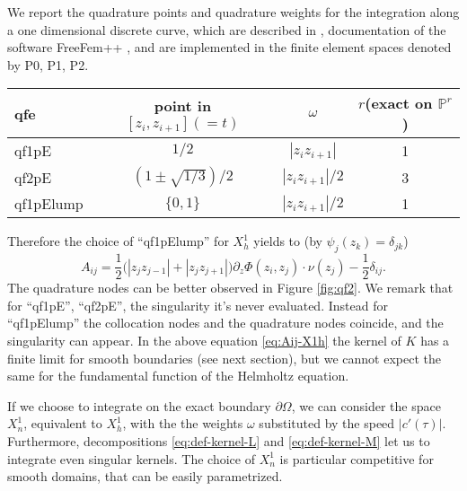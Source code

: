 \documentclass[10pt, a4paper]{article} %
\numberwithin{equation}{section}
\theoremstyle{definition}
\theoremstyle{plain}
\theoremstyle{plain}
\theoremstyle{plain}
\theoremstyle{plain}
\theoremstyle{plain}
\theoremstyle{plain}
\theoremstyle{plain}
\theoremstyle{plain}
\begin{document}
We report the quadrature points and quadrature weights for the integration 
along a one dimensional discrete curve, which are
described in \cite{FreeFem-doc}, documentation of the software
FreeFem++ \cite{FreeFem}, and are implemented in the finite element spaces
denoted by P0, P1, P2.
\begin{center}
\begin{tabular}{lccc}
\toprule
 qfe & point in $[z_i, z_{i+1}](=t)$ & 
 $\omega$ & $r$(exact on $\mathbb{P}^r$)\\
\midrule
qf1pE & $1/2$ &  $|z_iz_{i+1}|$ & 1\\
qf2pE & $(1\pm\sqrt{1/3})/2$ &  $|z_iz_{i+1}|/2$ & 3\\
qf1pElump & $\{0, 1\}$ & $|z_iz_{i+1}|/2$ & 1\\
\bottomrule
\end{tabular}
\end{center}
Therefore the choice of ``qf1pElump'' for $X^1_h$ yields to (by $\psi_j(z_k) = \delta_{jk}$)
\begin{equation}
\label{eq:Aij-X1h}
 A_{ij} = \frac{1}{2}\big(|z_jz_{j-1}| + |z_jz_{j+1}|\big)\partial_{z}\Phi(z_i,z_j)\cdot \nu(z_j) - \frac{1}{2} \delta_{ij}.
\end{equation}
The quadrature nodes can be better observed in Figure \ref{fig:qf2}.
We remark that for ``qf1pE'', ``qf2pE'', the singularity it's never evaluated. Instead for ``qf1pElump''
the collocation nodes and the quadrature nodes coincide, and the singularity can appear.
In the above equation \eqref{eq:Aij-X1h} the kernel of $K$ has a finite limit for smooth boundaries (see next section),
but we cannot expect the same for the fundamental function of the Helmholtz equation.
\par
If we choose to integrate on the exact boundary $\partial\Omega$,
we can consider the space $X^1_n$, equivalent to $X^1_h$, with the
the weights $\omega$ substituted by the speed $|c'(\tau)|$.
Furthermore, decompositions \eqref{eq:def-kernel-L} and \eqref{eq:def-kernel-M} let us to integrate even singular kernels.
The choice of $X^1_n$ is particular competitive for smooth domains, 
that can be easily parametrized.
\end{document}
